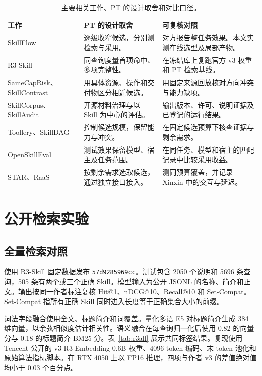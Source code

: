 \documentclass[final,5p,twocolumn,10pt]{elsarticle}
\begin{document}
\begin{table}[!t]
\centering\small
\caption{主要相关工作、PT 的设计取舍和对比口径。}
\label{tab:influence}
\begin{tabularx}{\textwidth}{@{}>{\raggedright\arraybackslash}p{}YY@{}}
\toprule
工作 & PT 的设计取舍 & 可复核对照 \\
\midrule
SkillFlow\cite{skillflow} & 逐级收窄候选，分别测检索与采用。 & 对方报告整任务效果。本文实测在线选型及局部产物。 \\
R3-Skill\cite{r3,r3vthree} & 同查询度量首项命中、多项完整性。 & 在冻结库上复跑官方 v3 权重和 PT 检索基线。 \\
SameCapRisk、SkillContrast\cite{risk,contrast} & 用具体资源、操作和交付物区分相近候选。 & 用固定来源回放核对方向冲突与能力缺项。 \\
SkillCorpus、SkillAudit\cite{corpus,audit} & 开源材料治理与以 Skill 为中心的评估。 & 输出版本、许可、说明证据及已登记的运行结果。 \\
Toollery、SkillDAG\cite{toollery,dag} & 控制候选规模，保留能力与冲突。 & 在固定候选预算下核查证据与剩余需求。 \\
OpenSkillEval\cite{open} & 测试效果保留模型、宿主及任务范围。 & 在同任务、模型和宿主的匹配记录中比较采用收益。 \\
STAR、RaaS\cite{star,raas} & 按剩余需求选取候选，通过独立接口接入。 & 测同预算覆盖，并记录 Xinxin 中的交互与延迟。 \\
\bottomrule
\end{tabularx}
\end{table}

\section{公开检索实验}\label{sec:closed}

\subsection{全量检索对照}

使用 R3-Skill 固定数据发布 \texttt{57d9285969cc}。测试包含 2050 个说明和 5696 条查询，505 条有两个或三个正确 Skill。模型输入为公开 JSONL 的名称、简介和正文。输出按同一作者标注复核 Hit@1、nDCG@10、Recall@10 和 Set-Compat。Set-Compat 指所有正确 Skill 同时进入长度等于正确集合大小的前缀\cite{r3}。

词法字段融合使用全文、标题简介和词覆盖。量化多语 E5 对标题简介生成 384 维向量，以余弦相似度估计相关性\cite{e5}。语义融合在每查询归一化后使用 0.82 的向量分与 0.18 的标题简介 BM25 分。表~\ref{tab:r3all} 展示共同标签结果。复现使用 Tencent 公开的 v3 R3-Embedding-0.6B 权重、4096 token 编码、末 token 池化和原始算法指标脚本\cite{r3vthree}。在 RTX 4050 上以 FP16 推理，四项与作者 v3 的差值绝对值均小于 0.03 个百分点。
\end{document}
